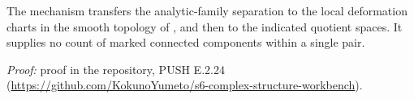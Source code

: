 The mechanism transfers the analytic-family separation to the local deformation charts in the smooth topology of \cite[\S2.1 and \S3.2, Theorem~3.4 and Remark~3.6]{Meersseman2019E}, and then to the indicated quotient spaces. It supplies no count of marked connected components within a single pair.

\noindent\emph{Proof:} proof in the repository, PUSH E.2.24 (\url{https://github.com/KokunoYumeto/s6-complex-structure-workbench}).

